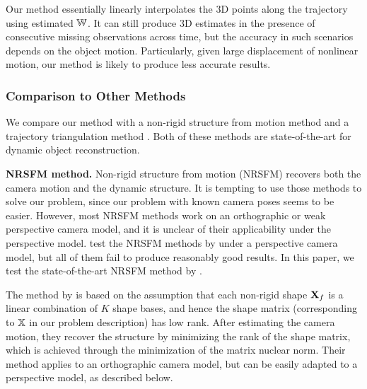 Our method essentially linearly interpolates the 3D points along the trajectory using estimated  $\mathbb W$. It can still produce 3D estimates in the presence of consecutive missing observations across time, but the accuracy in such scenarios depends on the object motion. Particularly, given large displacement of nonlinear motion, our method is likely to produce less accurate results.

 

 
\subsubsection{Comparison to Other Methods} \label{sec:comparison_to_other_methods}
We compare our method with a non-rigid structure from motion method \cite{dai2014simple} and a trajectory triangulation method \cite{Valmadre_CVPR2012}. Both of these methods are state-of-the-art for dynamic object reconstruction.

\textbf{NRSFM method.} Non-rigid structure from motion (NRSFM) recovers both the camera motion and the dynamic structure. It is tempting to use those methods to solve our problem, since our problem with known camera poses seems to be easier. 
However, most NRSFM methods work on an orthographic or weak perspective camera model, and it is unclear of their applicability under the perspective model. \citet{Park_ECCV2010} test the NRSFM methods by \citet{Akhter_NIPS08,torresani2008nonrigid,paladini2009factorization} under a perspective camera model, but all of them fail to produce reasonably good results. In this paper, we test the state-of-the-art NRSFM method by \citet{dai2014simple}.

The method by \citet{dai2014simple} is based on the assumption that each non-rigid shape $\mathbf X_f$ is a linear combination of $K$ shape bases, and hence the shape matrix (corresponding to $\mathbb X$ in our problem description) has low rank.
After estimating the camera motion,  they recover the structure by minimizing the rank of the shape matrix, which is achieved through the minimization of the matrix nuclear norm.  Their method applies to an orthographic camera model, but can be easily adapted to a perspective model, as described below. 

